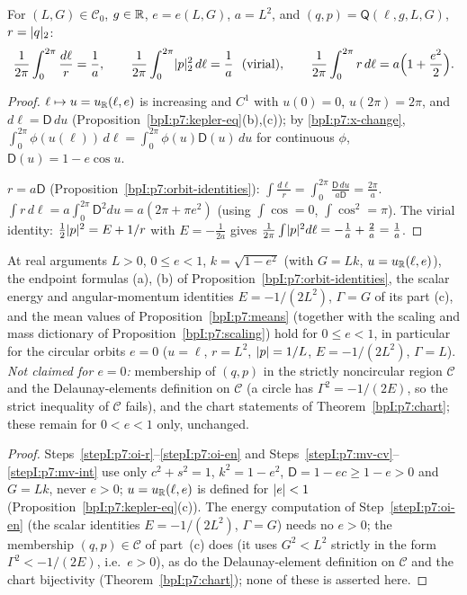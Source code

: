 \begin{proposition}\label{bpI:p7:means}
For $(L,G)\in\mathcal C_0$, $g\in\mathbb{R}$, $e=e(L,G)$, $a=L^2$, and $(q,p)=\mathsf Q(\ell,g,L,G)$, $r=\lvert q\rvert_2$:
\[
\frac1{2\pi}\int_0^{2\pi}\frac{d\ell}{r}=\frac1a,\qquad\frac1{2\pi}\int_0^{2\pi}\abs p_2^2\,d\ell=\frac1a\ \ (\text{virial}),\qquad\frac1{2\pi}\int_0^{2\pi}r\,d\ell=a\Bigl(1+\frac{e^2}2\Bigr).
\]
\end{proposition}
\begin{proof}
\label{stepI:p7:mv-cv} $\ell\mapsto u=u_{\mathbb{R}}(\ell,e)$ is increasing and $C^1$ with $u(0)=0$, $u(2\pi)=2\pi$, and $d\ell=\mathsf D\,du$ (Proposition~\ref{bpI:p7:kepler-eq}(b),(c)); by \ref{bpI:p7:x-change}, $\int_0^{2\pi}\phi(u(\ell))\,d\ell=\int_0^{2\pi}\phi(u)\mathsf D(u)\,du$ for continuous $\phi$, $\mathsf D(u)=1-e\cos u$.

\label{stepI:p7:mv-int} $r=a\mathsf D$ (Proposition~\ref{bpI:p7:orbit-identities}): $\int\frac{d\ell}{r}=\int_0^{2\pi}\frac{\mathsf D\,du}{a\mathsf D}=\frac{2\pi}a$. $\int r\,d\ell=a\int_0^{2\pi}\mathsf D^2du=a(2\pi+\pi e^2)$ (using $\int\cos=0$, $\int\cos^2=\pi$). The virial identity: $\tfrac12\lvert p\rvert^2=E+1/r$ with $E=-\tfrac1{2a}$ gives $\frac1{2\pi}\int\lvert p\rvert^2d\ell=-\frac1a+\frac2a=\frac1a$.
\end{proof}

\begin{corollary}\label{bpI:p7:circular}
At real arguments $L>0$, $0\le e<1$, $k=\sqrt{1-e^2}$ (with $G=Lk$, $u=u_{\mathbb{R}}(\ell,e)$), the endpoint formulas (a), (b) of Proposition~\ref{bpI:p7:orbit-identities}, the scalar energy and angular-momentum identities $E=-1/(2L^2)$, $\Gamma=G$ of its part (c), and the mean values of Proposition~\ref{bpI:p7:means} (together with the scaling and mass dictionary of Proposition~\ref{bpI:p7:scaling}) hold for $0\le e<1$, in particular for the circular orbits $e=0$ ($u=\ell$, $r=L^2$, $\lvert p\rvert=1/L$, $E=-1/(2L^2)$, $\Gamma=L$).
\emph{Not claimed for $e=0$:} membership of $(q,p)$ in the strictly noncircular region $\mathcal C$ and the Delaunay-elements definition on $\mathcal C$ (a circle has $\Gamma^2=-1/(2E)$, so the strict inequality of $\mathcal C$ fails), and the chart statements of Theorem~\ref{bpI:p7:chart}; these remain for $0<e<1$ only, unchanged.
\end{corollary}
\begin{proof}
\label{stepI:p7:ci-alg} Steps~\ref{stepI:p7:oi-r}--\ref{stepI:p7:oi-en} and Steps~\ref{stepI:p7:mv-cv}--\ref{stepI:p7:mv-int} use only $c^2+s^2=1$, $k^2=1-e^2$, $\mathsf D=1-ec\ge1-e>0$ and $G=Lk$, never $e>0$; $u=u_{\mathbb{R}}(\ell,e)$ is defined for $\lvert e\rvert<1$ (Proposition~\ref{bpI:p7:kepler-eq}(c)). The energy computation of Step~\ref{stepI:p7:oi-en} (the scalar identities $E=-1/(2L^2)$, $\Gamma=G$) needs no $e>0$; the membership $(q,p)\in\mathcal C$ of part~(c) does (it uses $G^2<L^2$ strictly in the form $\Gamma^2<-1/(2E)$, i.e.\ $e>0$), as do the Delaunay-element definition on $\mathcal C$ and the chart bijectivity (Theorem~\ref{bpI:p7:chart}); none of these is asserted here.
\end{proof}

